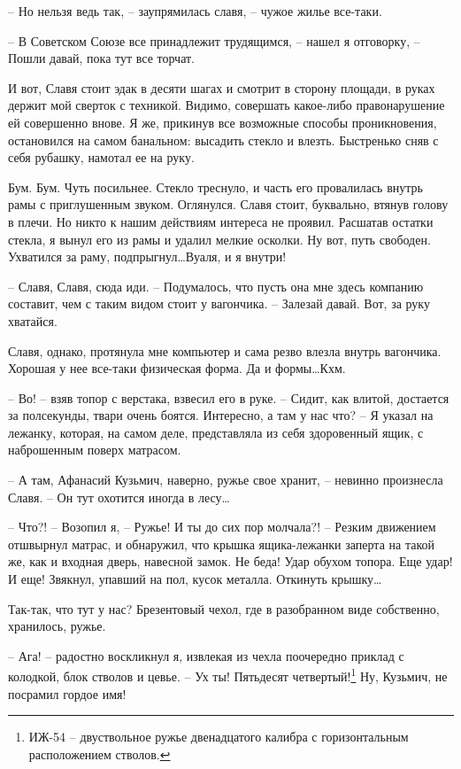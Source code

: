 \documentclass[a4paper]{book}
\begin{document}
-- Но нельзя ведь так, -- заупрямилась славя, -- чужое жилье все-таки.

-- В Советском Союзе все принадлежит трудящимся, -- нашел я отговорку, -- Пошли давай, пока тут все торчат.

И вот, Славя стоит эдак в десяти шагах и смотрит в сторону площади, в руках держит мой сверток с техникой. Видимо, совершать какое-либо правонарушение ей совершенно внове. Я же, прикинув все возможные способы проникновения, остановился на самом банальном: высадить стекло и влезть. Быстренько сняв с себя рубашку, намотал ее на руку.

Бум. Бум. Чуть посильнее. Стекло треснуло, и часть его провалилась внутрь рамы с приглушенным звуком. Оглянулся. Славя стоит, буквально, втянув голову в плечи. Но никто к нашим действиям интереса не проявил. Расшатав остатки стекла, я вынул его из рамы и удалил мелкие осколки. Ну вот, путь свободен. Ухватился за раму, подпрыгнул\ldots Вуаля, и я внутри!

-- Славя, Славя, сюда иди. -- Подумалось, что пусть она мне здесь компанию составит, чем с таким видом стоит у вагончика.  -- Залезай давай. Вот, за руку хватайся. 

Славя, однако, протянула мне компьютер  и сама резво влезла внутрь вагончика. Хорошая у нее все-таки физическая форма. Да и формы\ldots Кхм. 

-- Во! -- взяв топор с верстака, взвесил его в руке. -- Сидит, как влитой, достается за полсекунды, твари очень боятся. Интересно, а там у нас что? -- Я указал  на лежанку, которая, на самом деле, представляла из себя здоровенный ящик, с наброшенным поверх матрасом.

-- А там, Афанасий Кузьмич, наверно, ружье свое хранит, -- невинно произнесла Славя. -- Он тут охотится иногда в лесу\ldots

-- Что?! -- Возопил я, -- Ружье! И ты до сих пор молчала?! -- Резким движением  отшвырнул матрас, и обнаружил, что крышка ящика-лежанки заперта на такой же, как и входная дверь, навесной замок. Не беда! Удар обухом топора. Еще удар! И еще! Звякнул, упавший на пол, кусок металла. Откинуть крышку\ldots 

Так-так, что тут у нас? Брезентовый чехол, где в разобранном виде собственно, хранилось, ружье. 

-- Ага! -- радостно воскликнул я, извлекая из чехла поочередно приклад с колодкой, блок стволов и цевье. -- Ух ты! Пятьдесят четвертый!\footnote{ИЖ-54 -- двуствольное ружье двенадцатого калибра с горизонтальным расположением стволов.} Ну, Кузьмич, не посрамил гордое имя!
\end{document}
